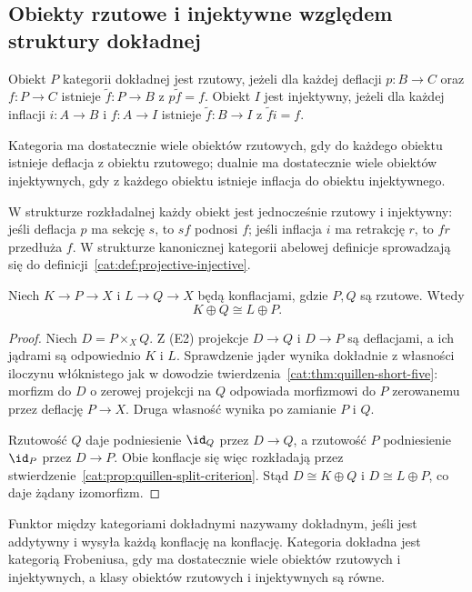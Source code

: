 \subsection{Obiekty rzutowe i injektywne względem struktury dokładnej}

\begin{definicja}\label{cat:def:quillen-projective-injective}
Obiekt $P$ kategorii dokładnej jest rzutowy, jeżeli dla każdej deflacji $p:B\to C$ oraz $f:P\to C$ istnieje $\widetilde f:P\to B$ z $p\widetilde f=f$. Obiekt $I$ jest injektywny, jeżeli dla każdej inflacji $i:A\to B$ i $f:A\to I$ istnieje $\widetilde f:B\to I$ z $\widetilde f i=f$.

Kategoria ma dostatecznie wiele obiektów rzutowych, gdy do każdego obiektu istnieje deflacja z obiektu rzutowego; dualnie ma dostatecznie wiele obiektów injektywnych, gdy z każdego obiektu istnieje inflacja do obiektu injektywnego.
\end{definicja}

W strukturze rozkładalnej każdy obiekt jest jednocześnie rzutowy i injektywny: jeśli deflacja $p$ ma sekcję $s$, to $sf$ podnosi $f$; jeśli inflacja $i$ ma retrakcję $r$, to $fr$ przedłuża $f$. W strukturze kanonicznej kategorii abelowej definicje sprowadzają się do definicji~\ref{cat:def:projective-injective}.

\begin{twierdzenie}\label{cat:thm:quillen-schanuel}
Niech $K\to P\to X$ i $L\to Q\to X$ będą konflacjami, gdzie $P,Q$ są rzutowe. Wtedy
\[
 K\oplus Q\cong L\oplus P.
\]
\end{twierdzenie}
\begin{proof}
Niech $D=P\times_X Q$. Z (E2) projekcje $D\to Q$ i $D\to P$ są deflacjami, a ich jądrami są odpowiednio $K$ i $L$. Sprawdzenie jąder wynika dokładnie z własności iloczynu włóknistego jak w dowodzie twierdzenia~\ref{cat:thm:quillen-short-five}: morfizm do $D$ o zerowej projekcji na $Q$ odpowiada morfizmowi do $P$ zerowanemu przez deflację $P\to X$. Druga własność wynika po zamianie $P$ i $Q$.

Rzutowość $Q$ daje podniesienie $\id_Q$ przez $D\to Q$, a rzutowość $P$ podniesienie $\id_P$ przez $D\to P$. Obie konflacje się więc rozkładają przez stwierdzenie~\ref{cat:prop:quillen-split-criterion}. Stąd $D\cong K\oplus Q$ i $D\cong L\oplus P$, co daje żądany izomorfizm.
\end{proof}

\begin{definicja}\label{cat:def:quillen-exact-frobenius}
Funktor między kategoriami dokładnymi nazywamy dokładnym, jeśli jest addytywny i wysyła każdą konflację na konflację. Kategoria dokładna jest kategorią Frobeniusa, gdy ma dostatecznie wiele obiektów rzutowych i injektywnych, a klasy obiektów rzutowych i injektywnych są równe.
\end{definicja}

